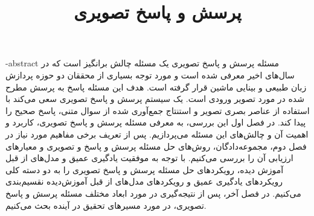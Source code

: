 



\subject{مهندسی کامپیوتر}


\title{پرسش و پاسخ تصویری}







\firstPage
\besmPage

\fa-abstract{
مسئله پرسش و پاسخ تصویری یک مسئله چالش برانگیز است که در سال‌‌های اخیر معرفی شده است و مورد توجه بسیاری از محققان دو حوزه پردازش زبان طبیعی و بینایی ماشین قرار گرفته است. هدف این مسئله پاسخ به پرسش مطرح شده در مورد تصویر ورودی است. یک سیستم پرسش و پاسخ تصویری سعی می‌کند با استفاده از عناصر بصری تصویر و استنتاج جمع‌آوری شده از سوال متنی، پاسخ صحیح را پیدا کند. در فصل اول این بررسی، به معرفی مسئله پرسش و پاسخ تصویری، کاربرد و اهمیت آن و چالش‌های این مسئله می‌پردازیم. پس از تعریف  برخی مفاهیم مورد نیاز در فصل دوم، مجموعه‌دادگان، روش‌های حل مسئله پرسش و پاسخ و تصویری و معیارهای ارزیابی آن را بررسی می‌کنیم. با توجه به موفقیت ‌یادگیری عمیق و مدل‌های از قبل آموزش دیده، رویکرد‌های حل مسئله پرسش و پاسخ تصویری را به دو دسته کلی رویکرد‌های یادگیری عمیق و رویکرد‌های مدل‌های از قبل آموزش‌‌دیده نقسیم‌بندی می‌کنیم. در فصل آخر، پس از نتیجه‌گیری در مورد ابعاد مختلف مسئله پرسش و پاسخ تصویری، در مورد مسیرهای تحقیق در آینده بحث می‌کنیم.
}
\abstractPage

\newpage
\clearpage